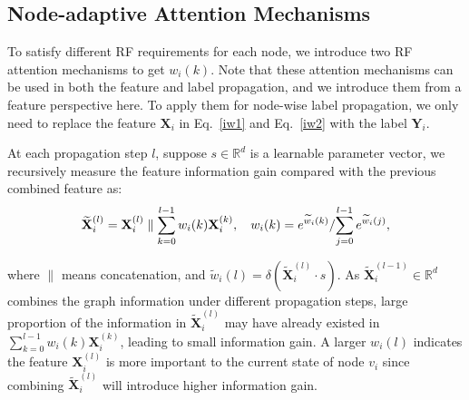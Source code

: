 \documentclass[sigconf]{acmart}
\begin{document}
\subsection{Node-adaptive Attention Mechanisms}
To satisfy different RF requirements for each node, we introduce two RF attention mechanisms to get $w_{i}(k)$.
Note that these attention mechanisms can be used in both the feature and label propagation, and we introduce them from a feature perspective here.
To apply them for node-wise label propagation, we only need to replace the feature $\mathbf{X}_i$ in Eq.~\ref{iw1} and Eq.~\ref{iw2} with the label $\mathbf{Y}_i$.
\label{RFA}

\begin{definition}
\label{df2}
At each propagation step $l$, suppose $s \in \mathbb{R}^{d}$ is a learnable parameter vector, we recursively measure the feature information gain compared with the previous combined feature as:
\begin{equation}
\small
\label{iw1}
\widetilde{\mathbf{X}}_i^{(l)} = \mathbf{X}_i^{(l)} \parallel \sum_{k=0}^{l-1} w_i(k) \mathbf{X}_i^{(k)},  \quad  w_{i}(k) = {e^{\widetilde{w}_{i}(k)}}/{\sum \limits_{j=0}\limits^{l-1} e^{\widetilde{w}_{i}(j)}},
\end{equation}
\end{definition}
where $\parallel$ means concatenation, and ${\widetilde{w}_{i}(l)} = \delta(\widetilde{\mathbf{X}}_i^{(l)} \cdot s)$.
As $\widetilde{\mathbf{X}}_i^{(l-1)} \in \mathbb{R}^{d}$ combines the graph information under different propagation steps,  large proportion of the information in $\widetilde{\mathbf{X}}_i^{(l)}$ may have already existed in $\sum_{k=0}^{l-1} w_i(k) \mathbf{X}_i^{(k)}$, leading to small information gain.
A larger $w_{i}(l)$ indicates the feature $\mathbf{X}_i^{(l)}$ is more important to the current state of node $v_i$ since combining $\widetilde{\mathbf{X}}_i^{(l)}$ will introduce higher information gain.
\end{document}
